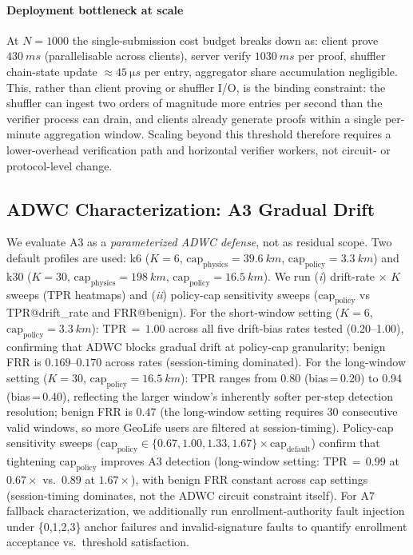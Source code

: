 \documentclass[conference]{IEEEtran}
\theoremstyle{definition}
\theoremstyle{plain}
\begin{document}
\paragraph{Deployment bottleneck at scale}
At $N{=}1000$ the single-submission cost budget breaks down as: client
prove $\SI{430}{ms}$ (parallelisable across clients), server verify
$\SI{1030}{ms}$ per proof, shuffler chain-state update
${\approx}\SI{45}{\micro s}$ per entry, aggregator share accumulation
negligible. This, rather than client proving or
shuffler I/O, is the binding constraint: the shuffler can ingest two
orders of magnitude more entries per second than the verifier process can drain,
and clients already generate proofs within a single
per-minute aggregation window. Scaling beyond this threshold therefore
requires a lower-overhead verification path and horizontal verifier workers,
not circuit- or
protocol-level change.

\subsection{ADWC Characterization: A3 Gradual Drift}
\label{sec:eval-a3}

We evaluate A3 as a \emph{parameterized ADWC defense}, not as residual scope.
Two default profiles are used: k6
($K{=}6$, $\mathrm{cap}_{\mathrm{physics}}=\SI{39.6}{km}$,
$\mathrm{cap}_{\mathrm{policy}}=\SI{3.3}{km}$) and k30
($K{=}30$, $\mathrm{cap}_{\mathrm{physics}}=\SI{198}{km}$,
$\mathrm{cap}_{\mathrm{policy}}=\SI{16.5}{km}$). We run
(\emph{i}) drift-rate $\times$ $K$ sweeps (TPR heatmaps) and
(\emph{ii}) policy-cap sensitivity sweeps
($\mathrm{cap}_{\mathrm{policy}}$ vs TPR@drift\_rate and FRR@benign).
For the short-window setting ($K{=}6$, $\mathrm{cap}_{\mathrm{policy}}{=}\SI{3.3}{km}$):
TPR$\,{=}\,1.00$ across all five drift-bias rates tested (0.20--1.00),
confirming that ADWC blocks gradual drift at policy-cap granularity;
benign FRR is $0.169$--$0.170$ across rates (session-timing dominated).
For the long-window setting ($K{=}30$, $\mathrm{cap}_{\mathrm{policy}}{=}\SI{16.5}{km}$):
TPR ranges from 0.80 (bias\,=\,0.20) to 0.94 (bias\,=\,0.40), reflecting
the larger window's inherently softer per-step detection resolution;
benign FRR is $0.47$ (the long-window setting requires 30 consecutive valid windows,
so more GeoLife users are filtered at session-timing).
Policy-cap sensitivity sweeps
($\mathrm{cap}_{\mathrm{policy}} \in \{0.67,1.00,1.33,1.67\}\!\times\!\mathrm{cap}_{\mathrm{default}}$)
confirm that tightening $\mathrm{cap}_{\mathrm{policy}}$ improves A3 detection
(long-window setting: TPR$\,{=}\,0.99$ at $0.67\!\times$ vs.\ $0.89$ at $1.67\!\times$),
with benign FRR constant across cap settings (session-timing dominates,
not the ADWC circuit constraint itself).
For A7 fallback characterization, we additionally run enrollment-authority
fault injection under \{0,1,2,3\} anchor failures and invalid-signature
faults to quantify enrollment acceptance vs.\ threshold satisfaction.
\end{document}

